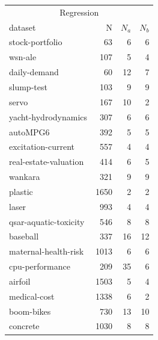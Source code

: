 \begin{tabular}{l@{\hspace{16pt}}r@{\hspace{16pt}}r@{\hspace{16pt}}r}
\toprule
\multicolumn{4}{c}{Regression} \\
dataset & N & $N_a$ & $N_b$ \\
\midrule
stock-portfolio & 63 & 6 & 6 \\
wsn-ale & 107 & 5 & 4 \\
daily-demand & 60 & 12 & 7 \\
slump-test & 103 & 9 & 9 \\
servo & 167 & 10 & 2 \\
yacht-hydrodynamics & 307 & 6 & 6 \\
autoMPG6 & 392 & 5 & 5 \\
excitation-current & 557 & 4 & 4 \\
real-estate-valuation & 414 & 6 & 5 \\
wankara & 321 & 9 & 9 \\
plastic & 1650 & 2 & 2 \\
laser & 993 & 4 & 4 \\
qsar-aquatic-toxicity & 546 & 8 & 8 \\
baseball & 337 & 16 & 12 \\
maternal-health-risk & 1013 & 6 & 6 \\
cpu-performance & 209 & 35 & 6 \\
airfoil & 1503 & 5 & 4 \\
medical-cost & 1338 & 6 & 2 \\
boom-bikes & 730 & 13 & 10 \\
concrete & 1030 & 8 & 8 \\
\bottomrule
\end{tabular}
